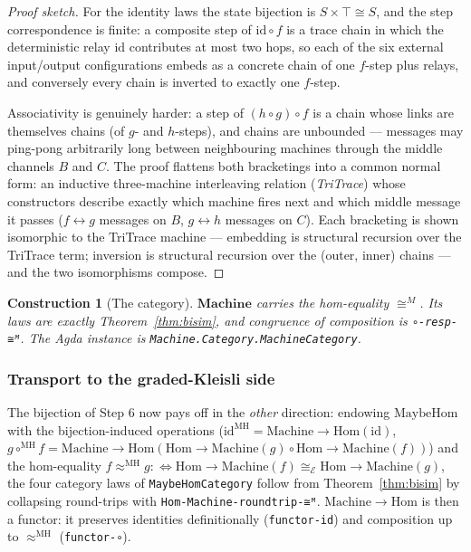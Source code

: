 \documentclass[11pt]{article}
\newtheorem{construction}[theorem]{Construction}
\newcommand{\id}{\mathrm{id}}
\newcommand{\Machine}{\mathbf{Machine}}
\begin{document}
\begin{proof}[Proof sketch]
For the identity laws the state bijection is
$S \times \top \cong S$, and the step correspondence is finite: a
composite step of $\id \circ f$ is a trace chain in which the
deterministic relay $\id$ contributes at most two hops, so each of
the six external input/output configurations embeds as a concrete
chain of one $f$-step plus relays, and conversely every chain is
inverted to exactly one $f$-step.

Associativity is genuinely harder: a step of $(h \circ g) \circ f$
is a chain whose links are themselves chains (of $g$- and $h$-steps),
and chains are unbounded --- messages may ping-pong arbitrarily long
between neighbouring machines through the middle channels $B$ and
$C$.  The proof flattens both bracketings into a common normal form:
an inductive three-machine interleaving relation (\emph{TriTrace})
whose constructors describe exactly which machine fires next and
which middle message it passes ($f \leftrightarrow g$ messages on
$B$, $g \leftrightarrow h$ messages on $C$).  Each bracketing is
shown isomorphic to the TriTrace machine --- embedding is structural
recursion over the TriTrace term; inversion is structural recursion
over the (outer, inner) chains --- and the two isomorphisms compose.
\end{proof}

\begin{construction}[The category]
$\Machine$ carries the hom-equality $\cong^{M}$.  Its laws are
exactly Theorem~\ref{thm:bisim}, and congruence of composition is
\texttt{∘-resp-≅ᴹ}.  The Agda instance is
\texttt{Machine.Category.MachineCategory}.
\end{construction}

\subsubsection{Transport to the graded-Kleisli side}

The bijection of Step 6 now pays off in the \emph{other} direction:
endowing $\mathrm{MaybeHom}$ with the bijection-induced operations
($\id^{\mathrm{MH}} = \mathrm{Machine{\to}Hom}(\id)$, $g \circ^{\mathrm{MH}} f =
\mathrm{Machine{\to}Hom}(\mathrm{Hom{\to}Machine}(g) \circ
\mathrm{Hom{\to}Machine}(f))$) and the hom-equality
$f \approx^{\mathrm{MH}} g :\iff \mathrm{Hom{\to}Machine}(f)
\cong_\mathcal{E} \mathrm{Hom{\to}Machine}(g)$, the four category laws
of \texttt{MaybeHomCategory} follow from Theorem~\ref{thm:bisim} by
collapsing round-trips with \texttt{Hom-Machine-roundtrip-≅ᴹ}.
$\mathrm{Machine{\to}Hom}$ is then a functor: it preserves identities
definitionally (\texttt{functor-id}) and composition up to
$\approx^{\mathrm{MH}}$ (\texttt{functor-∘}).
\end{document}
